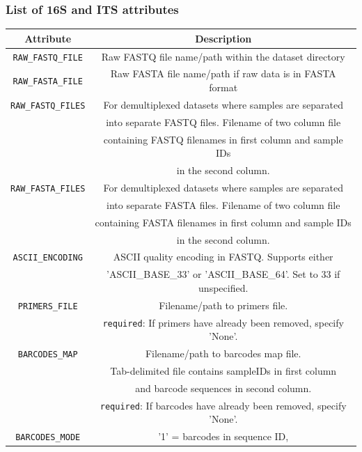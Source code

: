 \documentclass[11pt, oneside]{article}   	%
\begin{document}
\subsubsection{List of 16S and ITS attributes}\label{sec:summarytable}
\begin{center}
\begin{longtable}{| c | c |}
    \hline
      \textbf{Attribute} & \textbf{Description} \\
      \hline
      {\tt RAW\_FASTQ\_FILE} & Raw FASTQ file name/path within the dataset directory \\
      \hline
      {\tt RAW\_FASTA\_FILE} & Raw FASTA file name/path if raw data is in FASTA format \\
      \hline
      {\tt RAW\_FASTQ\_FILES}
       & For demultiplexed datasets where samples are separated \\
       & into separate FASTQ files.  Filename of two column file \\
       & containing FASTQ filenames in first column and sample IDs \\
       & in the second column. \\
       \hline
      {\tt RAW\_FASTA\_FILES} 
       & For demultiplexed datasets where samples are separated \\
       & into separate FASTA files.  Filename of two column file \\
       & containing FASTA filenames in first column and sample IDs \\
       & in the second column. \\
       \hline
      {\tt ASCII\_ENCODING} & ASCII quality encoding in FASTQ.  Supports either \\
       & 'ASCII\_BASE\_33'  or 'ASCII\_BASE\_64'.  Set to 33 if unspecified. \\
       \hline
      {\tt PRIMERS\_FILE} & Filename/path to primers file. \\
       & {\tt required}: If primers have already been removed, specify 'None'. \\
       \hline
      {\tt BARCODES\_MAP} & Filename/path to barcodes map file. \\
       & Tab-delimited file contains sampleIDs in first column \\
       & and barcode sequences in second column. \\
       & {\tt required}: If barcodes have already been removed, specify 'None'. \\
       \hline
      {\tt BARCODES\_MODE} & '1' = barcodes in sequence ID, \\

\end{longtable}
\end{center}
\end{document}
